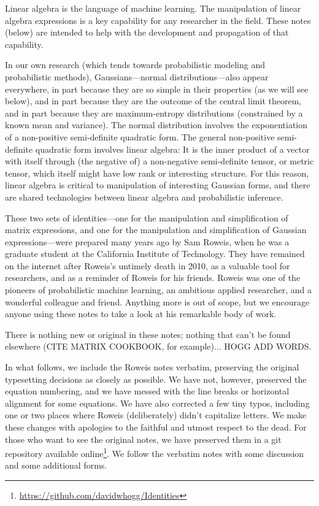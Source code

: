 \documentclass[12pt]{article}
\begin{document}
Linear algebra is the language of machine learning.
The manipulation of linear algebra expressions is a key capability for
any researcher in the field.
These notes (below) are intended to help with the development and
propagation of that capability.

In our own research (which tends towards probabilistic modeling and
probabilistic methods), Gaussians---normal distributions---also appear
everywhere, in part because they are so simple in their properties
(as we will see below), and in part because
they are the outcome of the central limit theorem, and in part
because they are maximum-entropy distributions (constrained by
a known mean and variance).
The normal distribution involves the exponentiation of a
non-positive semi-definite quadratic form.
The general non-positive semi-definite quadratic form involves linear
algebra:
It is the inner product of a vector with itself through (the negative
of) a non-negative semi-definite tensor, or metric tensor, which
itself might have low rank or interesting structure.
For this reason, linear algebra is critical to manipulation of
interesting Gaussian forms, and there are shared technologies between
linear algebra and probabilistic inference.

These two sets of identities---one for the manipulation and
simplification of matrix expressions, and one for the manipulation and
simplification of Gaussian expressions---were prepared many years ago
by Sam Roweis, when he was a graduate
student at the California Institute of Technology.
They have remained on the internet after Roweis's untimely death in 2010,
as a valuable tool for researchers, and as a reminder of Roweis for his
friends.
Roweis was one of the pioneers of probabilistic machine learning, an ambitious
applied researcher, and a wonderful colleague and friend.
Anything more is out of scope, but we encourage anyone using these notes to
take a look at his remarkable body of work.

There is nothing new or original in these notes; nothing that can't be found
elsewhere (CITE MATRIX COOKBOOK, for example)... HOGG ADD WORDS.

In what follows, we include the Roweis notes verbatim, preserving
the original typesetting decisions as closely as possible.
We have not, however, preserved the equation numbering,
and we have messed with the line breaks or horizontal alignment for some equations.
We have also corrected a few tiny typos, including one or two places where
Roweis (deliberately) didn't capitalize letters.
We make these changes with apologies to the faithful and utmost respect to the dead.
For those who want to see the original notes, we have preserved them in a git
repository available online\footnote{\url{https://github.com/davidwhogg/Identities}}.
We follow the verbatim notes with some discussion and some additional forms.
\end{document}
